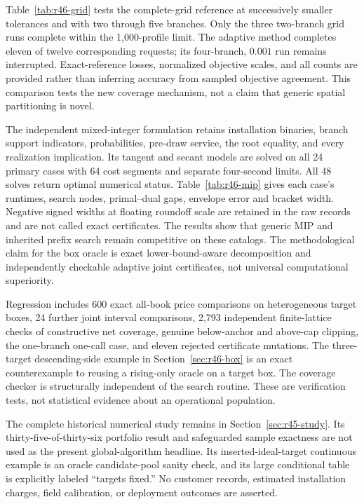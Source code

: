 Table~\ref{tab:r46-grid} tests the complete-grid reference at successively smaller tolerances and with two through five branches. Only the three two-branch grid runs complete within the 1,000-profile limit. The adaptive method completes eleven of twelve corresponding requests; its four-branch, $0.001$ run remains interrupted. Exact-reference losses, normalized objective scales, and all counts are provided rather than inferring accuracy from sampled objective agreement. This comparison tests the new coverage mechanism, not a claim that generic spatial partitioning is novel.

The independent mixed-integer formulation retains installation binaries, branch support indicators, probabilities, pre-draw service, the root equality, and every realization implication. Its tangent and secant models are solved on all 24 primary cases with 64 cost segments and separate four-second limits. All 48 solves return optimal numerical status. Table~\ref{tab:r46-mip} gives each case's runtimes, search nodes, primal--dual gaps, envelope error and bracket width. Negative signed widths at floating roundoff scale are retained in the raw records and are not called exact certificates. The results show that generic MIP and inherited prefix search remain competitive on these catalogs. The methodological claim for the box oracle is exact lower-bound-aware decomposition and independently checkable adaptive joint certificates, not universal computational superiority.

Regression includes 600 exact all-book price comparisons on heterogeneous target boxes, 24 further joint interval comparisons, 2,793 independent finite-lattice checks of constructive net coverage, genuine below-anchor and above-cap clipping, the one-branch one-call case, and eleven rejected certificate mutations. The three-target descending-side example in Section~\ref{sec:r46-box} is an exact counterexample to reusing a rising-only oracle on a target box. The coverage checker is structurally independent of the search routine. These are verification tests, not statistical evidence about an operational population.

The complete historical numerical study remains in Section~\ref{sec:r45-study}. Its thirty-five-of-thirty-six portfolio result and safeguarded sample exactness are not used as the present global-algorithm headline. Its inserted-ideal-target continuous example is an oracle candidate-pool sanity check, and its large conditional table is explicitly labeled ``targets fixed.'' No customer records, estimated installation charges, field calibration, or deployment outcomes are asserted.
